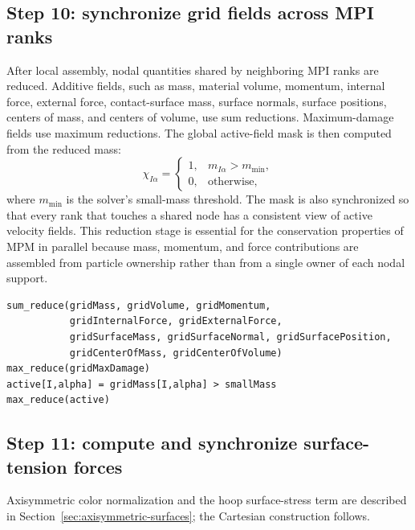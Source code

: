\subsection{Step 10: synchronize grid fields across MPI ranks}
\label{subsec:solver-step-10}
After local assembly, nodal quantities shared by neighboring MPI ranks are reduced.  Additive fields, such as mass, material volume, momentum, internal force, external force, contact-surface mass, surface normals, surface positions, centers of mass, and centers of volume, use sum reductions.  Maximum-damage fields use maximum reductions.  The global active-field mask is then computed from the reduced mass:
\begin{equation}
  \chi_{I\alpha}=\begin{cases}
  1, & m_{I\alpha} > m_{\min},\\
  0, & \text{otherwise},
  \end{cases}
\end{equation}
where $m_{\min}$ is the solver's small-mass threshold.  The mask is also synchronized so that every rank that touches a shared node has a consistent view of active velocity fields.  This reduction stage is essential for the conservation properties of MPM in parallel because mass, momentum, and force contributions are assembled from particle ownership rather than from a single owner of each nodal support.

\begin{lstlisting}[caption={Grid synchronization.},basicstyle=\ttfamily\small]
sum_reduce(gridMass, gridVolume, gridMomentum,
           gridInternalForce, gridExternalForce,
           gridSurfaceMass, gridSurfaceNormal, gridSurfacePosition,
           gridCenterOfMass, gridCenterOfVolume)
max_reduce(gridMaxDamage)
active[I,alpha] = gridMass[I,alpha] > smallMass
max_reduce(active)
\end{lstlisting}

\subsection{Step 11: compute and synchronize surface-tension forces}
\label{subsec:solver-step-11}
Axisymmetric color normalization and the hoop surface-stress term are described
in Section~\ref{sec:axisymmetric-surfaces}; the Cartesian construction follows.

